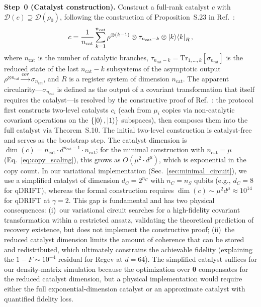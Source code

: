 \documentclass[prx,twocolumn,superscriptaddress,longbibliography,floatfix]{revtex4-2}
\begin{document}
\textbf{Step~0 (Catalyst construction).}
Construct a full-rank catalyst $c$ with $\mathcal{D}(c) \supseteq \mathcal{D}(\rho_0)$, following the construction of Proposition~S.23 in Ref.~\cite{Shiraishi2024}:
\begin{equation}
c = \frac{1}{n_\mathrm{cat}} \sum_{k=1}^{n_\mathrm{cat}} \rho^{\otimes(k-1)} \otimes \tau_{n_\mathrm{cat}-k} \otimes \ket{k}\!\bra{k}_R,
\label{eq:catalyst}
\end{equation}
where $n_\mathrm{cat}$ is the number of catalytic branches, $\tau_{n_\mathrm{cat}-k} = \mathrm{Tr}_{1,\ldots,k}[\sigma_{n_\mathrm{cat}}]$ is the reduced state of the last $n_\mathrm{cat}-k$ subsystems of the asymptotic output $\rho^{\otimes n_\mathrm{cat}} \xrightarrow{\mathrm{cov}} \sigma_{n_\mathrm{cat}}$, and $R$ is a register system of dimension $n_\mathrm{cat}$.
The apparent circularity---$\sigma_{n_\mathrm{cat}}$ is defined as the output of a covariant transformation that itself requires the catalyst---is resolved by the constructive proof of Ref.~\cite{Shiraishi2024}: the protocol first constructs two-level catalysts $c_i$ (each from $\mu_i$ copies via non-catalytic covariant operations on the $\{\ket{0}, \ket{1}\}$ subspaces), then composes them into the full catalyst via Theorem~S.10.
The initial two-level construction is catalyst-free and serves as the bootstrap step.
The catalyst dimension is $\dim(c) = n_\mathrm{cat} \cdot d^{n_\mathrm{cat}-1} \cdot n_\mathrm{cat}$; for the minimal construction with $n_\mathrm{cat} = \mu$ (Eq.~\eqref{eq:copy_scaling}), this grows as $O(\mu^2 \cdot d^\mu)$, which is exponential in the copy count.
In our variational implementation (Sec.~\ref{sec:minimal_circuit}), we use a simplified catalyst of dimension $d_C = 2^{n_C}$ with $n_C = n_S$ qubits (e.g., $d_C = 8$ for qDRIFT), whereas the formal construction requires $\dim(c) \sim \mu^2 d^\mu \approx 10^{14}$ for qDRIFT at $\gamma = 2$.
This gap is fundamental and has two physical consequences: (i)~our variational circuit searches for a high-fidelity covariant transformation within a restricted ansatz, validating the theoretical prediction of recovery existence, but does not implement the constructive proof; (ii)~the reduced catalyst dimension limits the amount of coherence that can be stored and redistributed, which ultimately constrains the achievable fidelity (explaining the $1 - F \sim 10^{-4}$ residual for Regev at $d = 64$).
The simplified catalyst suffices for our density-matrix simulation because the optimization over $\boldsymbol{\theta}$ compensates for the reduced catalyst dimension, but a physical implementation would require either the full exponential-dimension catalyst or an approximate catalyst with quantified fidelity loss.
\end{document}
